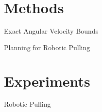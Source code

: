 \documentclass[10pt]{beamer}
\newcommand{\themename}{\textbf{\textsc{metropolis}}\xspace}
\begin{document}
\section{Methods}

\begin{frame}{Exact Angular Velocity Bounds}
\end{frame}

\begin{frame}{Planning for Robotic Pulling}
\end{frame}

\section{Experiments}

\begin{frame}{Robotic Pulling}
  
\end{frame}








\end{document}
